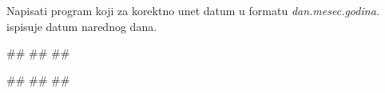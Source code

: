 \begin{Exercise}[label=p1.2_17] 
 Napisati program koji za korektno unet datum u formatu \textit{dan.mesec.godina.} ispisuje datum narednog dana. 
 
\begin{miditest}
\begin{upotreba}{1}
#\naslovInt#
##
##
\end{upotreba}
\end{miditest}
\begin{miditest}
\begin{upotreba}{2}
#\naslovInt#
##
##
\end{upotreba}
\end{miditest}
\end{Exercise}
\begin{Answer}[ref=p1.2_17]
\end{Answer}






